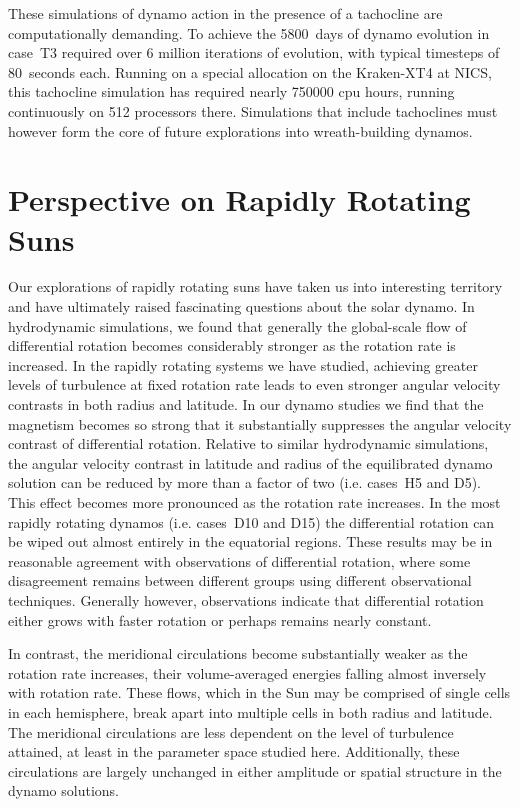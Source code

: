 These simulations of dynamo action in the presence of a tachocline are
computationally demanding.  To achieve the 5800~days of dynamo
evolution in case~T3 required over 6 million iterations of evolution,
with typical timesteps of 80~seconds each.  Running on a special
allocation on the Kraken-XT4 at NICS, this tachocline simulation has
required nearly 750000 cpu hours, running continuously on 512
processors there.  Simulations that include tachoclines must however
form the core of future explorations into wreath-building dynamos.

\clearpage
\section{Perspective on Rapidly Rotating Suns}

Our explorations of rapidly rotating suns have taken us into
interesting territory and have ultimately raised fascinating questions
about the solar dynamo.  In hydrodynamic simulations, we found that
generally the global-scale flow of differential rotation becomes
considerably stronger as the rotation rate is increased.  In the
rapidly rotating systems we have studied, achieving greater levels of
turbulence at fixed rotation rate leads to even stronger angular
velocity contrasts in both radius and latitude.  In our dynamo studies
we find that the magnetism becomes so strong that it substantially
suppresses the angular velocity contrast of differential rotation.
Relative to similar hydrodynamic simulations, the angular velocity
contrast in latitude and radius of the equilibrated dynamo solution
can be reduced by more than a factor of two (i.e. cases~H5 and D5).
This effect becomes more pronounced as the rotation rate increases.
In the most rapidly rotating dynamos (i.e. cases~D10 and D15) the
differential rotation can be wiped out almost entirely in the
equatorial regions.  These results may be in reasonable agreement with
observations of differential rotation, where some disagreement
remains between different groups using different observational
techniques.  Generally however, observations indicate that
differential rotation either grows with faster rotation or perhaps
remains nearly constant.

In contrast, the meridional circulations become substantially weaker as
the rotation rate increases, their volume-averaged energies falling
almost inversely with rotation rate.  These flows, which in the Sun
may be comprised of single cells in each hemisphere, break apart into
multiple cells in both radius and latitude.  The meridional
circulations are less dependent on the level of turbulence attained,
at least in the parameter space studied here.  Additionally, these
circulations are largely unchanged in either amplitude or spatial
structure in the dynamo solutions.  

